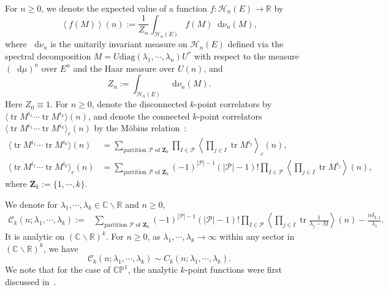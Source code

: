 \documentclass[a4paper]{article}
\theoremstyle{plain}
\theoremstyle{definition}
\newcommand{\dif}{\mathop{}\!\mathrm{d}}
\newcommand{\RR}{\mathbb{R}}
\newcommand{\CC}{\mathbb{C}}
\newcommand{\diag}{\mathrm{diag}}
\DeclareMathOperator{\tr}{tr}
\begin{document}
For $n\ge0$, we denote the expected value of a function $f:\mathcal{H}_n(E)\to\RR$ by~\cite{Eynard, Mehta}
	\begin{equation}
		\left\langle f(M)\right\rangle(n):=\frac{1}{Z_n}\int_{\mathcal{H}_n(E)}f(M)\dif\nu_n(M),
	\end{equation} where $\dif\nu_n$ is the unitarily invariant measure on $\mathcal{H}_n(E)$ defined via the spectral decomposition $M=U\diag(\lambda_1,\cdots,\lambda_n)U^*$ with respect to the measure $(\dif\mu)^n$ over $E^n$ and the Haar measure over $U(n)$, and
	\begin{equation}
		Z_n:=\int_{\mathcal H_n(E)}\dif\nu_n(M).
	\end{equation}
	Here $Z_0\equiv1$. For $n\ge0$, denote the disconnected $k$-point correlators by $\langle\tr M^{i_1}\cdots\tr M^{i_k}\rangle(n)$, and denote the connected $k$-point correlators $\langle\tr M^{i_1}\cdots\tr M^{i_k}\rangle_c(n)$ by the M\"obius relation~\cite{Rota,Mehta,Emergent}:
	\begin{align}
		\langle\tr M^{i_1}\cdots\tr M^{i_k}\rangle(n)&=\sum_{\text{partition }\mathcal{P}\text{ of }\mathbf Z_k}\prod_{I\in\mathcal{P}}\left\langle\prod_{j\in I}\tr M^{i_j}\right\rangle_c(n),\\
		\langle\tr M^{i_1}\cdots\tr M^{i_k}\rangle_c(n)&=\sum_{\text{partition }\mathcal{P}\text{ of }\mathbf Z_k}(-1)^{|\mathcal P|-1}(|\mathcal P|-1)!\prod_{I\in\mathcal{P}}\left\langle\prod_{j\in I}\tr M^{i_j}\right\rangle(n),
	\end{align}
	where $\mathbf Z_k:=\{1,\cdots,k\}$.

	We denote for $\lambda_1,\cdots,\lambda_k\in\CC\backslash\RR$ and $n\ge0$,
	\begin{align}
		\mathcal C_k(n;\lambda_1,\cdots,\lambda_k):=&\sum_{\text{partition }\mathcal{P}\text{ of }\mathbf Z_k}(-1)^{|\mathcal P|-1}(|\mathcal P|-1)!\prod_{I\in\mathcal{P}}\left\langle\prod_{j\in I}\tr\frac{1}{\lambda_j-M}\right\rangle(n)-\frac{n\delta_{k,1}}{\lambda_1}.
	\end{align}
	It is analytic on $(\CC\backslash\RR)^k$. For $n\ge0$, as $\lambda_1,\cdots,\lambda_k\to\infty$ within any sector in $(\CC\backslash\RR)^k$, we have
	\begin{equation} \label{asym-func}
		\mathcal C_k(n;\lambda_1,\cdots,\lambda_k)\sim C_k(n;\lambda_1,\cdots,\lambda_k).
	\end{equation}
We note that for the case of $\mathbb{CP}^1$, the analytic $k$-point functions were first discussed in~\cite{DYZcp1}.
\end{document}
